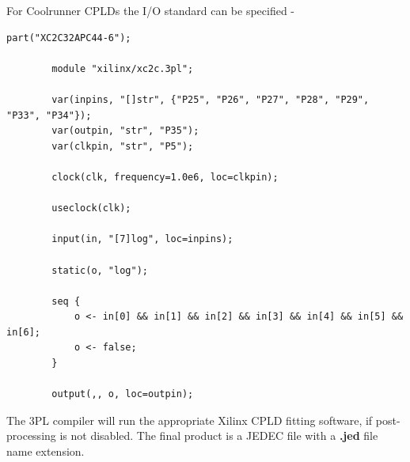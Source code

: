     For Coolrunner CPLDs the I/O standard can be specified -   
    \begin{lstlisting}[gobble=4, language=threepl]
        part("XC2C32APC44-6");

        module "xilinx/xc2c.3pl";

        var(inpins, "[]str", {"P25", "P26", "P27", "P28", "P29", "P33", "P34"});
        var(outpin, "str", "P35");
        var(clkpin, "str", "P5");

        clock(clk, frequency=1.0e6, loc=clkpin);

        useclock(clk);

        input(in, "[7]log", loc=inpins);

        static(o, "log");

        seq {
            o <- in[0] && in[1] && in[2] && in[3] && in[4] && in[5] && in[6];
            o <- false;
        }

        output(,, o, loc=outpin);
    \end{lstlisting}
    
    The 3PL compiler will run the appropriate Xilinx CPLD fitting software,
    if post-processing is not disabled.
    The final product is a JEDEC file with a {\bf .jed} file name extension.
